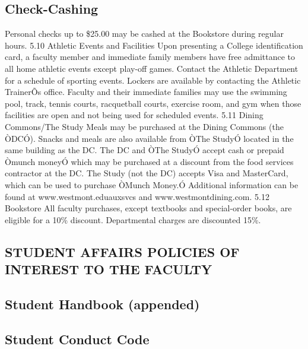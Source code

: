 \documentclass[letterpaper, 11pt]{article}
\begin{document}
	\subsection{Check-Cashing}
		Personal checks up to \$25.00 may be cashed at the Bookstore during regular hours.
		5.10 Athletic Events and Facilities
		Upon presenting a College identification card, a faculty member and immediate family members have free admittance to all home athletic events except play-off games.  Contact the Athletic Department for a schedule of sporting events.  Lockers are available by contacting the Athletic TrainerÕs office.  Faculty and their immediate families may use the swimming pool, track, tennis courts, racquetball courts, exercise room, and gym when those facilities are open and not being used for scheduled events.
		5.11 Dining Commons/The Study
		Meals may be purchased at the Dining Commons (the ÒDCÓ).  Snacks and meals are also available from ÒThe StudyÓ located in the same building as the DC.  The DC and ÒThe StudyÓ accept cash or prepaid Òmunch moneyÓ which may be purchased at a discount from the food services contractor at the DC.  The Study (not the DC) accepts Visa and MasterCard, which can be used to purchase ÒMunch Money.Ó  Additional information can be found at www.westmont.eduauxsvcs and www.westmontdining.com.
		5.12 Bookstore
		All faculty purchases, except textbooks and special-order books, are eligible
		for a 10\% discount.  Departmental charges are discounted 15\%.

	\subsection{STUDENT AFFAIRS POLICIES OF INTEREST TO THE FACULTY}
	\subsection{Student Handbook (appended)}
	\subsection{Student Conduct Code}
\end{document}
